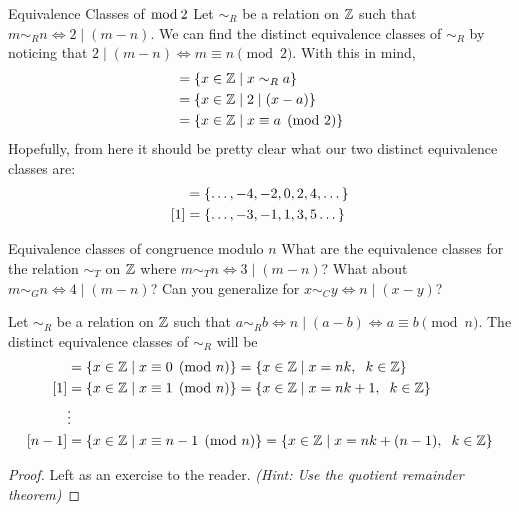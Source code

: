\begin{example}{Equivalence Classes of $\mathop{\bmod}{2}$}{}
    Let $\sim_R$ be a relation on $\mathbb Z$ such that $m \sim_R n \Leftrightarrow 2 \mid (m - n)$. We can find the distinct equivalence classes of $\sim_R$ by noticing that $2 \mid (m-n) \Leftrightarrow m \equiv n \pmod{2}$. With this in mind,
    \begin{align*}
        [a] &= \braces{x \in \ZZ \mid x \sim_R a} \\
            &= \braces{x \in \ZZ \mid 2 \mid (x - a)} \\
            &= \braces{x \in \ZZ \mid x \equiv a \pmod{2}}
    \end{align*}
    Hopefully, from here it should be pretty clear what our two distinct equivalence classes are:
    \begin{align*}
        [0] &= \braces{\dots, -4 ,-2, 0, 2, 4, \dots} \\
        [1] &= \braces{\dots, -3, -1, 1, 3, 5 \dots} 
    \end{align*}
\end{example}

\begin{question}{Equivalence classes of congruence modulo $n$}{}
    What are the equivalence classes for the relation $\sim_T$ on $\mathbb Z$ where $m \sim_T n \Leftrightarrow 3 \mid (m-n)$? What about $m \sim_G n \Leftrightarrow 4 \mid (m-n)$? Can you generalize for $x \sim_C y \Leftrightarrow n \mid (x-y)$?
\end{question}

\begin{tcolorbox}[colback=pink]
\begin{theorem}
    Let $\sim_R$ be a relation on $\mathbb Z$ such that $a \sim_R b \Leftrightarrow n \mid (a-b) \Leftrightarrow a \equiv b \pmod{n}$. The distinct equivalence classes of $\sim_R$ will be 
    \begin{align*}
        [0] &= \braces{x \in \ZZ \mid x \equiv 0 \pmod{n}} = \braces{x \in \ZZ \mid x = nk, \hspace{0.2cm} k \in \ZZ} \\
        [1] &= \braces{x \in \ZZ \mid x \equiv 1 \pmod{n}} = \braces{x \in \ZZ \mid x = nk + 1, \hspace{0.2cm} k \in \ZZ} \\
        &\vdots \\
        [n-1] &= \braces{x \in \ZZ \mid x \equiv n-1 \pmod{n}} = \braces{x \in \ZZ \mid x = nk + (n-1), \hspace{0.2cm} k \in \ZZ}
    \end{align*}
\end{theorem}
\begin{proof}
    Left as an exercise to the reader. {\tiny\textit{(Hint: Use the quotient remainder theorem)}}
\end{proof}
\end{tcolorbox}